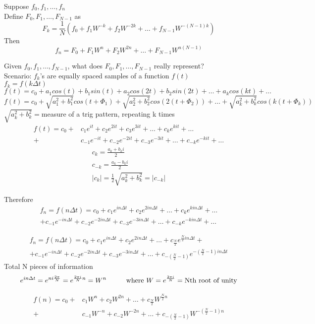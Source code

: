 \documentclass[10pt,usletter]{article}
\newcommand{\tab}[1][1cm]{\hspace*{#1}}
\begin{document}
Suppose $f_0,f_1,\hdots,f_n$\\
Define $F_0, F_1,\hdots,F_{N-1}$ as $$F_k=\frac{1}{N}(f_0+f_1W^{-k}+f_2W^{-2k}+\hdots+f_{N-1}W^{-(N-1)k})$$
Then $$f_n=F_0+F_1W^n+F_2W^{2n}+\hdots+F_{N-1}W^{n(N-1)}$$



Given $f_0,f_1,\hdots, f_{N-1}$, what does $F_0,F_1,\hdots, F_{N-1}$ really represent?\\
Scenario: $f_k$'s are equally spaced samples of a function $f(t)$\\
$f_k=f(k\Delta t)$ $$f(t)=c_0+a_1cos(t)+b_1sin(t)+a_2cos(2t)+b_2sin(2t)+\hdots+a_kcos(kt)+\hdots$$
$$f(t)=c_0+\sqrt{a_1^2+b_1^2}cos(t+\Phi_1)+\sqrt{a_2^2+b_2^2}cos(2(t+\Phi_2))+\hdots+\sqrt{a_k^2+b_k^2}cos(k(t+\Phi_k))$$
$\sqrt{a_k^2+b_k^2}=$measure of a trig pattern, repeating k times
\begin{align*}
f(t)=c_0+&c_1e^{it}+c_2e^{2it}+c_3e^{3it}+\hdots+c_ke^{kit}+\hdots\\
+&c_{-1}e^{-it}+c_{-2}e^{-2it}+c_{-3}e^{-3it}+\hdots+c_{-k}e^{-kit}+\hdots
\end{align*}
\begin{align*}
c_k=\frac{a_k+b_ki}{2}\\
c_{-k}=\frac{a_k-b_ki}{2}\\
|c_k|=\frac{1}{2}\sqrt{a_k^2+b_k^2}=|c_{-k}|
\end{align*}

Therefore
\begin{align*}
f_n=f(n\Delta t)=c_0+c_1e^{in\Delta t}+c_2e^{2in\Delta t}+\hdots+c_ke^{kin\Delta t}+\hdots\\
+c_{-1}e^{-in\Delta t} + c_{-2}e^{-2in\Delta t} +c_{-3}e^{-3in\Delta t} + \hdots + c_{-k}e^{-kin\Delta t}+\hdots
\end{align*}

\begin{align*}
f_n=f(n\Delta t)=c_0+c_1e^{in\Delta t}+c_2e^{2in\Delta t}+\hdots+c_{\frac{N}{2}}e^{\frac{N}{2}in\Delta t}+\\
+c_{-1}e^{-in\Delta t} + c_{-2}e^{-2in\Delta t} +c_{-3}e^{-3in\Delta t} + \hdots + c_{-(\frac{N}{2}-1)}e^{-(\frac{N}{2}-1)in\Delta t}
\end{align*}
Total N pieces of information
\begin{align*}
e^{in\Delta t}=e^{ni\frac{2\pi}{N}}=e^{\frac{2\pi i}{N}n}=W^n \tab \text{where } W=e^{\frac{2\pi i}{N}}=\text{Nth root of unity}
\end{align*}

\begin{align*}
f(n)=c_0+&c_1W^n+c_2W^{2n}+\hdots+c_{\frac{N}{2}}W^{\frac{N}{2}n}\\
+&c_{-1}W^{-n}+c_{-2}W^{-2n}+\hdots+c_{-(\frac{N}{2}-1)}W^{-(\frac{N}{2}-1)n}
\end{align*}
\end{document}
